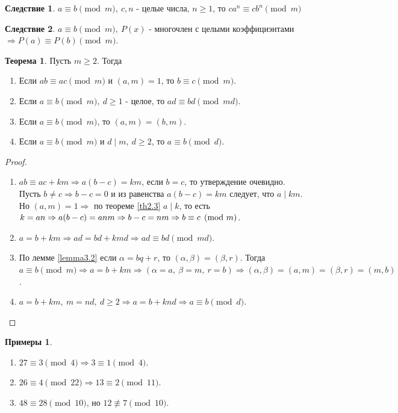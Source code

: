 \documentclass[a4paper, 12pt]{article}
\renewcommand{\div}{\mid}
\newcommand\tab[1][.5cm]{\hspace*{#1}}
\theoremstyle{definition}
\newtheorem{theorem}{Теорема}[section]
\newtheorem*{consequense}{Следствие}
\newtheorem*{examples}{Примеры}
\begin{document}
    \begin{consequense}
        $a\equiv b \pmod{m},\ c,n$ - целые числа, $n\geq 1$, то $ca^n\equiv cb^n \pmod{m}$
    \end{consequense} 
    \begin{consequense}
        $a\equiv b \pmod{m},\ P(x)$ - многочлен с целыми коэффициэнтами\\ $\Rightarrow P(a)\equiv P(b) \pmod{m}$.
    \end{consequense} 
    \begin{theorem}\label{th8.2}
        Пусть $m\geq 2$. Тогда 
        \begin{enumerate}
            \item Если $ab\equiv ac \pmod{m}$ и $(a,m)=1$, то $b\equiv c \pmod{m}$.
            \item Если $a\equiv b \pmod{m},\ d\geq 1$ - целое, то $ad\equiv bd \pmod{md}$.
            \item Если $a\equiv b \pmod{m}$, то $(a,m)=(b,m)$.
            \item Если $a\equiv b \pmod{m}$ и $d \div m,\ d\geq 2$, то $a\equiv b \pmod{d}$.
        \end{enumerate}
    \end{theorem} 
    \begin{proof}\tab
        \begin{enumerate}
            \item $ab\equiv ac+km \Rightarrow a(b-c)=km$, если $b=c$, то утверждение очевидно. Пусть $b\ne c \Rightarrow b-c=0$ и из равенства $a(b-c)=km$ следует, что $a\div km$. Но $(a,m)=1 \Rightarrow$ по теореме \ref{th2.3} $a\div k$, то есть $k=an \Rightarrow a(b-c)=anm\\
            \Rightarrow b-c=nm \Rightarrow b\equiv c \pmod{m}$.
            \item $a=b+km \Rightarrow ad=bd+kmd \Rightarrow ad\equiv bd \pmod{md}$.
            \item По лемме \ref{lemma3.2} если $\alpha=bq+r$, то $(\alpha,\beta)=(\beta,r)$. Тогда $a\equiv b \pmod{m} \Rightarrow a=b+km \Rightarrow (\alpha=a,\ \beta=m,\ r=b) \Rightarrow (\alpha,\beta)=(a,m)=(\beta,r)=(m,b)$.
            \item $a=b+km,\ m=nd,\ d\geq 2 \Rightarrow a=b+knd \Rightarrow a\equiv b \pmod{d}$.
        \end{enumerate}
    \end{proof} 
    \begin{examples}\tab
        \begin{enumerate}
            \item $27 \equiv 3 \pmod{4} \Rightarrow 3\equiv 1 \pmod{4}$.
            \item $26\equiv 4 \pmod{22} \Rightarrow 13\equiv 2 \pmod{11}$.
            \item $48\equiv 28 \pmod{10}$, но $12 \not\equiv 7 \pmod{10}$.
        \end{enumerate}
    \end{examples}
\end{document}
